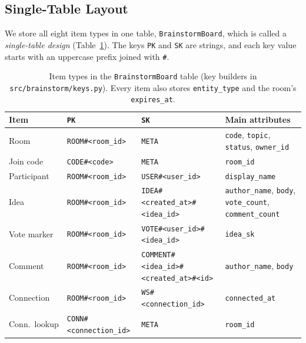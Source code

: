 \subsection{Single-Table Layout}\label{sec:dm-layout}

We store all eight item types in one table, \texttt{BrainstormBoard}, which is called a
\emph{single-table design} (Table~\ref{tab:items}). The keys \texttt{PK} and \texttt{SK} are
strings, and each key value starts with an uppercase prefix joined with \texttt{\#}.

\begin{table}[htbp]
  \centering
  \footnotesize
  \caption{Item types in the \texttt{BrainstormBoard} table (key builders in
    \texttt{src/brainstorm/keys.py}). Every item also stores \texttt{entity\_type} and the room's
    \texttt{expires\_at}.}
  \label{tab:items}
  \setlength{\tabcolsep}{4pt}
  \begin{tabularx}{\linewidth}{@{}lll>{\raggedright\arraybackslash}X@{}}
    \toprule
    Item & \texttt{PK} & \texttt{SK} & Main attributes \\
    \midrule
    Room & \texttt{ROOM\#\textless room\_id\textgreater} & \texttt{META} &
      \texttt{code}, \texttt{topic}, \texttt{status}, \texttt{owner\_id} \\
    Join code & \texttt{CODE\#\textless code\textgreater} & \texttt{META} & \texttt{room\_id} \\
    Participant & \texttt{ROOM\#\textless room\_id\textgreater} &
      \texttt{USER\#\textless user\_id\textgreater} & \texttt{display\_name} \\
    Idea & \texttt{ROOM\#\textless room\_id\textgreater} &
      \texttt{IDEA\#\textless created\_at\textgreater\#\textless idea\_id\textgreater} &
      \texttt{author\_name}, \texttt{body}, \texttt{vote\_count}, \texttt{comment\_count} \\
    Vote marker & \texttt{ROOM\#\textless room\_id\textgreater} &
      \texttt{VOTE\#\textless user\_id\textgreater\#\textless idea\_id\textgreater} &
      \texttt{idea\_sk} \\
    Comment & \texttt{ROOM\#\textless room\_id\textgreater} &
      \texttt{COMMENT\#\textless idea\_id\textgreater\#\textless created\_at\textgreater\#\textless id\textgreater} &
      \texttt{author\_name}, \texttt{body} \\
    Connection & \texttt{ROOM\#\textless room\_id\textgreater} &
      \texttt{WS\#\textless connection\_id\textgreater} & \texttt{connected\_at} \\
    Conn.\ lookup & \texttt{CONN\#\textless connection\_id\textgreater} & \texttt{META} &
      \texttt{room\_id} \\
    \bottomrule
  \end{tabularx}
\end{table}

